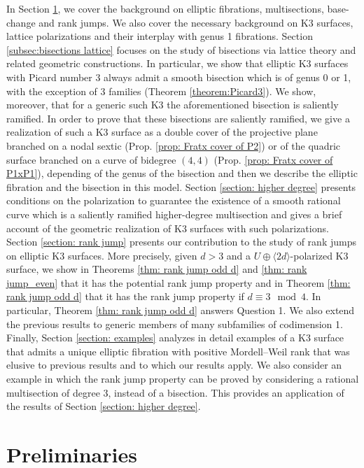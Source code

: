 \documentclass{amsart}
\theoremstyle{definition}
\numberwithin{equation}{section}
\begin{document}
In Section \ref{section: preliminaries}, we cover the background on elliptic fibrations, multisections, base-change and rank jumps. We also cover the necessary background on K3 surfaces, lattice polarizations and their interplay with genus 1 fibrations. Section \ref{subsec:bisections lattice} focuses on the study of bisections via lattice theory and related geometric constructions. In particular, we show that elliptic K3 surfaces with Picard number 3 always admit a smooth bisection which is of genus 0 or 1,  with the exception of 3 families (Theorem \ref{theorem:Picard3}). We show, moreover, that for a generic such K3 the aforementioned bisection is saliently ramified. In order to prove that these bisections are saliently ramified, we give a realization of such a K3 surface as a double cover of the projective plane branched on a nodal sextic (Prop. \ref{prop: Fratx cover of P2}) or of the quadric surface branched on a curve of bidegree $(4,4)$ (Prop. \ref{prop: Fratx cover of P1xP1}), depending of the genus of the bisection and then we describe the elliptic fibration and the bisection in this model. Section \ref{section: higher degree} presents conditions  on the polarization to guarantee the existence of a smooth rational curve which is a saliently ramified higher-degree multisection and gives a brief account of the geometric realization of K3 surfaces with such polarizations. Section \ref{section: rank jump} presents our contribution to the study of rank jumps on elliptic K3 surfaces. More precisely, given $d>3$ and a  $U\oplus \langle 2d\rangle$-polarized K3 surface, we show in Theorems \ref{thm: rank jump odd d} and \ref{thm: rank jump_even} that it has the potential rank jump property and in Theorem \ref{thm: rank jump odd d} that it has the rank jump property if $d\equiv 3\mod 4$. In particular, Theorem \ref{thm: rank jump odd d} answers Question 1. We also extend the previous results to generic members of many subfamilies of codimension 1. Finally, Section \ref{section: examples} analyzes in detail examples of a K3 surface that admits a unique elliptic fibration with positive Mordell--Weil rank that was elusive to previous results and to which our results apply. We also consider an example in which the rank jump property can be proved by considering a rational multisection of degree 3, instead of a bisection. This provides an application of the results of Section \ref{section: higher degree}.




\section{Preliminaries}\label{section: preliminaries}
\end{document}
